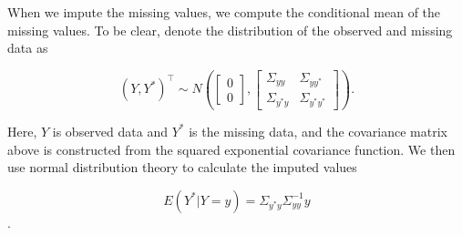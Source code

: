 \documentclass[12pt]{article}
\begin{document}
When we impute the missing values, we compute the conditional mean of
the missing values. To be clear, denote the distribution of the observed
and missing data as

\[ 
(Y,Y^*)^\top \sim N\left( \begin{bmatrix} 0 \\ 0 \end{bmatrix}, \begin{bmatrix} \Sigma_{yy} & \Sigma_{yy^*} \\ \Sigma_{y^*y} & \Sigma_{y^*y^*}\end{bmatrix} \right).
\]

\noindent Here, \(Y\) is observed data and \(Y^*\) is the missing data,
and the covariance matrix above is constructed from the squared
exponential covariance function. We then use normal distribution theory
to calculate the imputed values

\[ E(Y^*|Y = y) = \Sigma_{y^*y} \Sigma_{yy}^{-1}y \].



\end{document}
